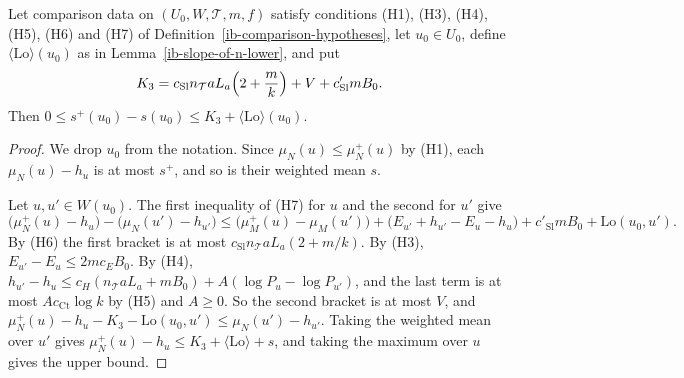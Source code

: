 \begin{lemma}\label{ib-spread}
Let comparison data on $(U_0,W,\mathcal T,m,f)$ satisfy conditions (H1), (H3),
(H4), (H5), (H6) and (H7) of Definition~\ref{ib-comparison-hypotheses}, let
$u_0\in U_0$, define $\langle\mathrm{Lo}\rangle(u_0)$ as in
Lemma~\ref{ib-slope-of-n-lower}, and put
\[
 K_3=c_{\mathrm{Sl}}n_{\mathcal T}aL_a\Bigl(2+\frac mk\Bigr)+V+c'_{\mathrm{Sl}}mB_0.
\]
Then $0\leq s^+(u_0)-s(u_0)\leq K_3+\langle\mathrm{Lo}\rangle(u_0)$.
\end{lemma}
\begin{proof}
We drop $u_0$ from the notation. Since $\mu_N(u)\leq\mu_N^+(u)$ by (H1), each
$\mu_N(u)-h_u$ is at most $s^+$, and so is their weighted mean $s$.

Let $u,u'\in W(u_0)$. The first inequality of (H7) for $u$ and the second for
$u'$ give
\[
 \bigl(\mu_N^+(u)-h_u\bigr)-\bigl(\mu_N(u')-h_{u'}\bigr)
 \leq\bigl(\mu_M^+(u)-\mu_M(u')\bigr)+\bigl(E_{u'}+h_{u'}-E_u-h_u\bigr)
 +c'_{\mathrm{Sl}}mB_0+\mathrm{Lo}(u_0,u').
\]
By (H6) the first bracket is at most $c_{\mathrm{Sl}}n_{\mathcal T}aL_a(2+m/k)$.
By (H3), $E_{u'}-E_u\leq2mc_EB_0$. By (H4),
$h_{u'}-h_u\leq c_H(n_{\mathcal T}aL_a+mB_0)+A(\log P_u-\log P_{u'})$, and the
last term is at most $Ac_{\mathrm{Ct}}\log k$ by (H5) and $A\geq0$. So the second
bracket is at most $V$, and
$\mu_N^+(u)-h_u-K_3-\mathrm{Lo}(u_0,u')\leq\mu_N(u')-h_{u'}$. Taking the
weighted mean over $u'$ gives $\mu_N^+(u)-h_u\leq K_3+\langle\mathrm{Lo}\rangle+s$,
and taking the maximum over $u$ gives the upper bound.
\end{proof}

